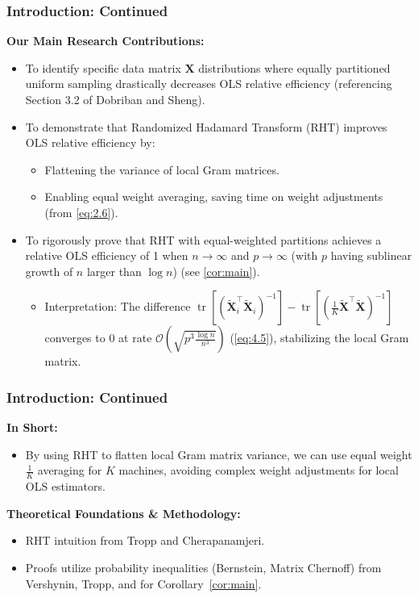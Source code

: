\documentclass{beamer}
\theoremstyle{remark}
\begin{document}
\begin{frame}
    \frametitle{Introduction: Continued}
    \textbf{Our Main Research Contributions:}
    \begin{itemize}
        \item To identify specific data matrix $\mathbf{X}$ distributions where equally partitioned uniform sampling drastically decreases OLS relative efficiency (referencing Section 3.2 of Dobriban and Sheng\cite{dobriban2022distributedlinearregressionaveraging}).
        \item To demonstrate that Randomized Hadamard Transform (RHT) improves OLS relative efficiency by:
            \begin{itemize}
                \item Flattening the variance of local Gram matrices.
                \item Enabling equal weight averaging, saving time on weight adjustments (from \ref{eq:2.6}).
            \end{itemize}
        \item To rigorously prove that RHT with equal-weighted partitions achieves a relative OLS efficiency of 1 when $n \to \infty$ and $p \to \infty$ (with $p$ having sublinear growth of $n$ larger than $\log n$) (see \ref{cor:main}).
            \begin{itemize}
                \item Interpretation: The difference $\operatorname{tr}[(\tilde{\mathbf{X}}_i^{\top}\tilde{\mathbf{X}}_i)^{-1}] - \operatorname{tr}[(\frac{1}{K}\tilde{\mathbf{X}}^{\top}\tilde{\mathbf{X}})^{-1}]$ converges to $0$ at rate $\mathcal{O}(\sqrt{p^{3}\frac{\log n}{n^{3}}})$ (\ref{eq:4.5}), stabilizing the local Gram matrix.
            \end{itemize}
    \end{itemize}
\end{frame}
\begin{frame}
    \frametitle{Introduction: Continued}
    \textbf{In Short:}
    \begin{itemize}
        \item By using RHT to flatten local Gram matrix variance, we can use equal weight $\frac{1}{K}$ averaging for $K$ machines, avoiding complex weight adjustments for local OLS estimators.
    \end{itemize}

    \textbf{Theoretical Foundations \& Methodology:}
    \begin{itemize}
        \item RHT intuition from Tropp\cite{tropp2011improvedanalysissubsampledrandomized} and Cherapanamjeri\cite{cherapanamjeri2022uniformapproximationsrandomizedhadamard}.
        \item Proofs utilize probability inequalities (Bernstein, Matrix Chernoff) from Vershynin\cite{vershynin2018high}, Tropp\cite{tropp2011improvedanalysissubsampledrandomized}, and \cite{Tropp_2011} for Corollary~\ref{cor:main}.
    \end{itemize}
\end{frame}
\end{document}
